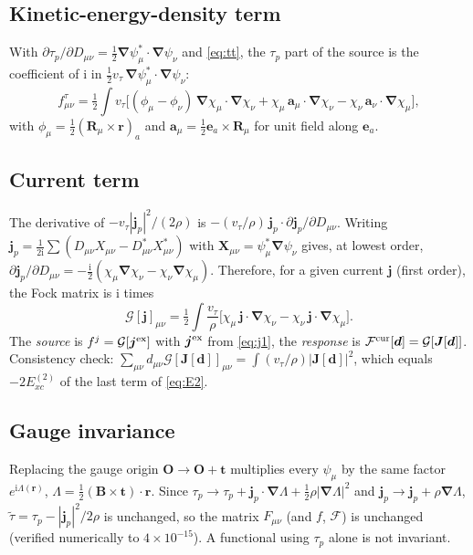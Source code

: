 \documentclass[11pt,a4paper]{article}
\newcommand{\rr}{\bm{r}}
\newcommand{\grad}{\bm{\nabla}}
\newcommand{\jp}{\bm{j}_p}
\newcommand{\vt}{v_\tau}
\newcommand{\ttil}{\tilde\tau}
\newcommand{\ci}{\mathrm{i}}
\begin{document}
\subsection{Kinetic-energy-density term}
With $\partial\tau_p/\partial D_{\mu\nu}=\tfrac12\grad\psi_\mu^*\!\cdot\!\grad\psi_\nu$ and \eqref{eq:tt}, the $\tau_p$ part of the source is the coefficient of $\ci$ in $\tfrac12\vt\,\grad\psi_\mu^*\!\cdot\!\grad\psi_\nu$:
\begin{equation}
f^{\tau}_{\mu\nu}=\tfrac12\int\vt\Big[(\phi_\mu-\phi_\nu)\,\grad\chi_\mu\!\cdot\!\grad\chi_\nu+\chi_\mu\,\bm a_\mu\!\cdot\!\grad\chi_\nu-\chi_\nu\,\bm a_\nu\!\cdot\!\grad\chi_\mu\Big],
\label{eq:ftau}
\end{equation}
with $\phi_\mu=\tfrac12(\bm R_\mu\times\rr)_a$ and $\bm a_\mu=\tfrac12\bm e_a\times\bm R_\mu$ for unit field along $\bm e_a$.

\subsection{Current term}
The derivative of $-\vt|\jp|^2/(2\rho)$ is $-(\vt/\rho)\,\jp\cdot\partial\jp/\partial D_{\mu\nu}$. Writing $\jp=\frac1{2\ci}\sum(D_{\mu\nu}X_{\mu\nu}-D^*_{\mu\nu}X^*_{\mu\nu})$ with $\bm X_{\mu\nu}=\psi^*_\mu\grad\psi_\nu$ gives, at lowest order, $\partial\jp/\partial D_{\mu\nu}=-\tfrac{\ci}2(\chi_\mu\grad\chi_\nu-\chi_\nu\grad\chi_\mu)$. Therefore, for a given current $\bm j$ (first order), the Fock matrix is $\ci$ times
\begin{equation}
\mathcal G[\bm j]_{\mu\nu}=\tfrac12\int\frac{\vt}{\rho}\Big[\chi_\mu\,\bm j\!\cdot\!\grad\chi_\nu-\chi_\nu\,\bm j\!\cdot\!\grad\chi_\mu\Big] .
\label{eq:G}
\end{equation}
The \emph{source} is $f^{j}=\mathcal G[\bm j^{\rm ex}]$ with $\bm j^{\rm ex}$ from \eqref{eq:j1}, the \emph{response} is $\mathcal F^{\rm cur}[\bm d]=\mathcal G[\bm J[\bm d]]$. Consistency check: $\sum_{\mu\nu}d_{\mu\nu}\mathcal G[\bm J[\bm d]]_{\mu\nu}=\int(\vt/\rho)|\bm J[\bm d]|^2$, which equals $-2E^{(2)}_{xc}$ of the last term of \eqref{eq:E2}.

\subsection{Gauge invariance}
Replacing the gauge origin $\bm O\to\bm O+\bm t$ multiplies every $\psi_\mu$ by the same factor $e^{\ci\Lambda(\rr)}$, $\Lambda=\tfrac12(\bm B\times\bm t)\cdot\rr$. Since $\tau_p\to\tau_p+\jp\cdot\grad\Lambda+\tfrac12\rho|\grad\Lambda|^2$ and $\jp\to\jp+\rho\grad\Lambda$, $\ttil=\tau_p-|\jp|^2/2\rho$ is unchanged, so the matrix $F_{\mu\nu}$ (and $f$, $\mathcal F$) is unchanged (verified numerically to $4\times10^{-15}$). A functional using $\tau_p$ alone is not invariant.
\end{document}
